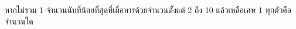﻿%
\question หากไม่รวม 1 จำนวนนับที่น้อยที่สุดที่เมื่อหารด้วยจำนวนตั้งแต่ 2 ถึง 10 แล้วเหลือเศษ 1 ทุกตัวคือจำนวนใด
\newline
{}
